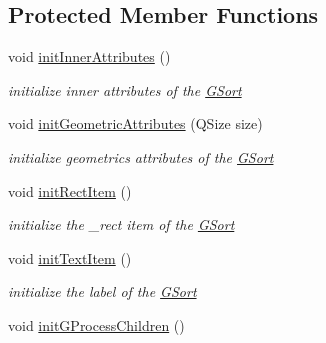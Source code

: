 \subsection*{Protected Member Functions}
\begin{DoxyCompactItemize}
\item 
\hypertarget{classGSort_a52469c9320660f61947a5dbacafbf364}{void \hyperlink{classGSort_a52469c9320660f61947a5dbacafbf364}{init\+Inner\+Attributes} ()}\label{classGSort_a52469c9320660f61947a5dbacafbf364}

\begin{DoxyCompactList}\small\item\em initialize inner attributes of the \hyperlink{classGSort}{G\+Sort} \end{DoxyCompactList}\item 
void \hyperlink{classGSort_afa2425ce7e23102d97a9084fb1e5eb74}{init\+Geometric\+Attributes} (Q\+Size size)
\begin{DoxyCompactList}\small\item\em initialize geometrics attributes of the \hyperlink{classGSort}{G\+Sort} \end{DoxyCompactList}\item 
\hypertarget{classGSort_a372e86482111d1b5405a77b7cee09bff}{void \hyperlink{classGSort_a372e86482111d1b5405a77b7cee09bff}{init\+Rect\+Item} ()}\label{classGSort_a372e86482111d1b5405a77b7cee09bff}

\begin{DoxyCompactList}\small\item\em initialize the \+\_\+rect item of the \hyperlink{classGSort}{G\+Sort} \end{DoxyCompactList}\item 
\hypertarget{classGSort_a72a0d9205b2ca98cd827377d5e4bb9f4}{void \hyperlink{classGSort_a72a0d9205b2ca98cd827377d5e4bb9f4}{init\+Text\+Item} ()}\label{classGSort_a72a0d9205b2ca98cd827377d5e4bb9f4}

\begin{DoxyCompactList}\small\item\em initialize the label of the \hyperlink{classGSort}{G\+Sort} \end{DoxyCompactList}\item 
\hypertarget{classGSort_adb374fdb97d1c2ed47ba46d92a7de298}{void \hyperlink{classGSort_adb374fdb97d1c2ed47ba46d92a7de298}{init\+G\+Process\+Children} ()}\label{classGSort_adb374fdb97d1c2ed47ba46d92a7de298}


\end{DoxyCompactItemize}
